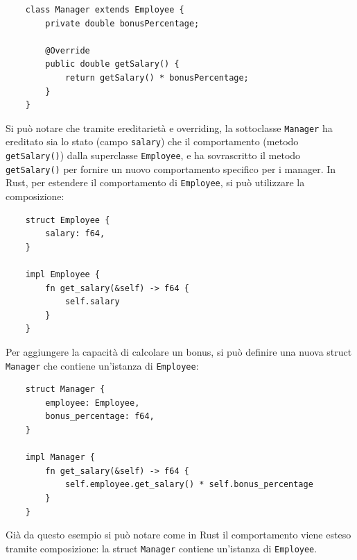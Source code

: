 \begin{verbatim}
    class Manager extends Employee {
        private double bonusPercentage;

        @Override
        public double getSalary() {
            return getSalary() * bonusPercentage;
        }
    }
\end{verbatim}
Si può notare che tramite ereditarietà e overriding, la sottoclasse \texttt{Manager} ha ereditato sia lo stato (campo \texttt{salary}) che il comportamento (metodo \texttt{getSalary()}) dalla superclasse \texttt{Employee}, e ha sovrascritto il metodo \texttt{getSalary()} per fornire un nuovo comportamento specifico per i manager. In Rust, per estendere il comportamento di \texttt{Employee}, si può utilizzare la composizione:
\begin{verbatim}
    struct Employee {
        salary: f64,
    }

    impl Employee {
        fn get_salary(&self) -> f64 {
            self.salary
        }
    }
\end{verbatim}
Per aggiungere la capacità di calcolare un bonus, si può definire una nuova struct \texttt{Manager} che contiene un'istanza di \texttt{Employee}:
\begin{verbatim}
    struct Manager {
        employee: Employee,
        bonus_percentage: f64,
    }

    impl Manager {
        fn get_salary(&self) -> f64 {
            self.employee.get_salary() * self.bonus_percentage
        }
    }
\end{verbatim}
Già da questo esempio si può notare come in Rust il comportamento viene esteso tramite composizione: la struct \texttt{Manager} contiene un'istanza di \texttt{Employee}. 

